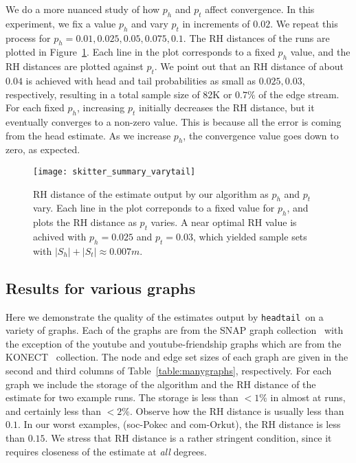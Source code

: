 \documentclass[11pt]{article}
\theoremstyle{definition}
\newcommand{\degdist}{{\tt headtail}}
\begin{document}
We do a more nuanced study of how $p_h$ and $p_t$ affect convergence.
In this experiment, we fix a value $p_h$ and vary $p_t$ in
increments of $0.02$.  We repeat this process for $p_h = 0.01, 0.025, 0.05,
0.075, 0.1$.  The RH distances of the runs are plotted in
Figure~\ref{fig:skitter_summary_varytail}.  Each line in the plot corresponds to
a fixed $p_h$ value, and the RH distances are plotted against $p_t$.  We point
out that an RH distance of about $0.04$ is achieved with head and tail
probabilities as small as $0.025, 0.03$, respectively, resulting in a total
sample size of 82K or $0.7\%$ of the edge stream.
For each fixed $p_h$, increasing $p_t$ initially decreases the RH distance, but it eventually
converges to a non-zero value. This is because all the error is coming from the head estimate.
As we increase $p_h$, the convergence value goes down to zero, as expected.
\begin{figure}
\centering \texttt{[image: skitter\_summary\_varytail]}
\captionsetup{width=0.9\textwidth}
\caption{RH distance of the estimate output by our algorithm as $p_h$ and $p_t$
vary.  Each line in the plot correponds to a fixed value for $p_h$, and plots
the RH distance as $p_t$ varies.  A near optimal RH value is achived with $p_h =
0.025$ and $p_t = 0.03$, which yielded sample sets with $|S_h|+|S_t| \approx
0.007m$.}
\label{fig:skitter_summary_varytail}
\end{figure}

\subsection{Results for various graphs}
Here we demonstrate the quality of the estimates output by \degdist~on a variety
of graphs.  Each of the graphs are from the SNAP graph collection~\cite{snap}
with the exception of the youtube and youtube-friendship graphs which are from
the KONECT~\cite{konect} collection.  The node and edge set sizes of each graph
are given in the second and third columns of Table~\ref{table:manygraphs},
respectively.  For each graph we include the storage of the
algorithm and the RH distance of the estimate for two example runs.
The storage is less than $< 1\%$ in almost at runs, and certainly less than $< 2\%$.
Observe how the RH distance is usually less than $0.1$. In our worst examples,
(soc-Pokec and com-Orkut), the RH distance is less than $0.15$. We stress that RH distance
is a rather stringent condition, since it requires closeness of the estimate
at \emph{all} degrees.
\end{document}
